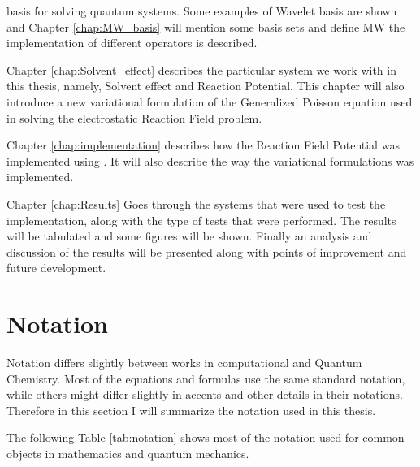 \documentclass[../master_thesis.tex]{subfiles}
\begin{document}
basis for solving quantum systems. Some examples of Wavelet basis are shown and
Chapter \ref{chap:MW_basis} will mention some basis sets and define \ac{MW}
the implementation of different operators is described.

Chapter \ref{chap:Solvent_effect}
describes the particular system we work with in this thesis, namely, Solvent
effect and Reaction Potential. This chapter will also introduce a new variational
formulation of the Generalized Poisson equation used in solving the electrostatic
Reaction Field problem.

Chapter \ref{chap:implementation} describes how the Reaction Field Potential was implemented
using \mrchem. It will also describe the way the variational formulations was implemented.

Chapter \ref{chap:Results} Goes through the systems that were used to test the implementation,
along with the type of tests that were performed. The results will be tabulated and
some figures will be shown. Finally an analysis and discussion of the results will be
presented along with points of improvement and future development.
\section{Notation}
Notation differs slightly between works in computational and Quantum Chemistry.
Most of the equations and formulas use the same standard notation, while others
might differ slightly in accents and other details in their notations. Therefore
in this section I will summarize the notation used in this thesis.

The following Table \ref{tab:notation} shows most of the notation used for
common objects in mathematics and quantum mechanics.
\end{document}

